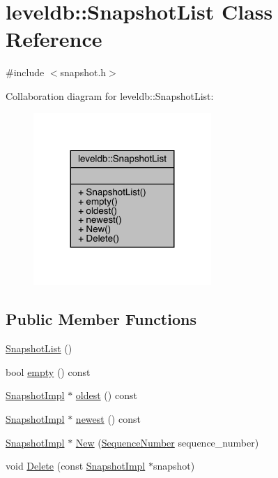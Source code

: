 \hypertarget{classleveldb_1_1_snapshot_list}{}\section{leveldb\+::Snapshot\+List Class Reference}
\label{classleveldb_1_1_snapshot_list}


{\ttfamily \#include $<$snapshot.\+h$>$}



Collaboration diagram for leveldb\+::Snapshot\+List\+:
\nopagebreak
\begin{figure}[H]
\begin{center}
\leavevmode
\includegraphics[width=191pt]{classleveldb_1_1_snapshot_list__coll__graph}
\end{center}
\end{figure}
\subsection*{Public Member Functions}
\begin{DoxyCompactItemize}
\item 
\mbox{\hyperlink{classleveldb_1_1_snapshot_list_a8e312959c2c2e2e64e9bb7eaca2459ae}{Snapshot\+List}} ()
\item 
bool \mbox{\hyperlink{classleveldb_1_1_snapshot_list_a1db6b1cbcd79669168052e088e8af84e}{empty}} () const
\item 
\mbox{\hyperlink{classleveldb_1_1_snapshot_impl}{Snapshot\+Impl}} $\ast$ \mbox{\hyperlink{classleveldb_1_1_snapshot_list_a2a7757163b6f737771430e3ea1697963}{oldest}} () const
\item 
\mbox{\hyperlink{classleveldb_1_1_snapshot_impl}{Snapshot\+Impl}} $\ast$ \mbox{\hyperlink{classleveldb_1_1_snapshot_list_ae4480f4d9059d78623773b7e87aad11b}{newest}} () const
\item 
\mbox{\hyperlink{classleveldb_1_1_snapshot_impl}{Snapshot\+Impl}} $\ast$ \mbox{\hyperlink{classleveldb_1_1_snapshot_list_a40ede9e24ef1c4f0544beb44b48f252e}{New}} (\mbox{\hyperlink{namespaceleveldb_a5481ededd221c36d652c371249f869fa}{Sequence\+Number}} sequence\+\_\+number)
\item 
void \mbox{\hyperlink{classleveldb_1_1_snapshot_list_a806aa482c5a66c080b75b897446f1dba}{Delete}} (const \mbox{\hyperlink{classleveldb_1_1_snapshot_impl}{Snapshot\+Impl}} $\ast$snapshot)
\end{DoxyCompactItemize}


